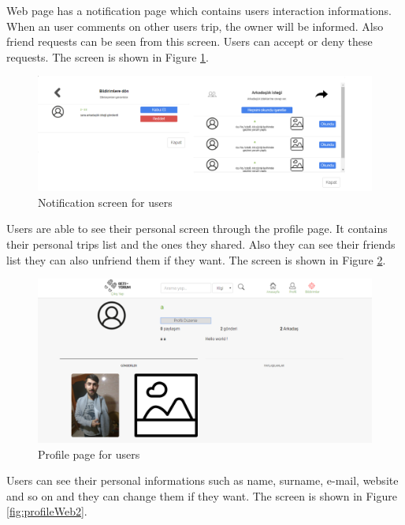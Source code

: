 \newpage

Web page has a notification page which contains users interaction informations. When an user comments on other users trip, the owner will be informed. Also friend requests can be seen from this screen. Users can accept or deny these requests. The screen is shown in Figure  \ref{fig:notificationPage}.

\begin{figure}[!htbp]
\centering
\includegraphics[width=\textwidth]{projectChapters/images/notificationPage.png}
\caption{Notification screen for users}
\label{fig:notificationPage}
\end{figure}

Users are able to see their personal screen through the profile page. It contains their personal trips list and the ones they shared. Also they can see their friends list they can also unfriend them if they want. The screen is shown in Figure  \ref{fig:profileWeb1}.

\begin{figure}[!htbp]
\centering
\includegraphics[width=\textwidth]{projectChapters/images/profileWeb1.png}
\caption{Profile page for users}
\label{fig:profileWeb1}
\end{figure}

\newpage

Users can see their personal informations such as name, surname, e-mail, website and so on and they can change them if they want. The screen is shown in Figure  \ref{fig:profileWeb2}.

